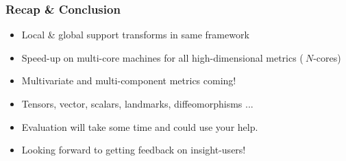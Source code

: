 \begin{frame}
\Large
\frametitle{Recap \& Conclusion}
\begin{itemize}
\item Local \& global support transforms in same framework
\pause
\item Speed-up on multi-core machines for all high-dimensional metrics ($~N$-cores)
\pause
\item Multivariate and multi-component metrics coming!
\pause
\item Tensors, vector, scalars, landmarks, diffeomorphisms ... 
\pause
\item Evaluation will take some time and could use your help.
\pause
\item Looking forward to getting feedback on insight-users! 
\end{itemize}
\end{frame}
